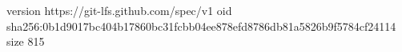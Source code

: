 version https://git-lfs.github.com/spec/v1
oid sha256:0b1d9017bc404b17860bc31fcbb04ee878efd8786db81a5826b9f5784cf24114
size 815
